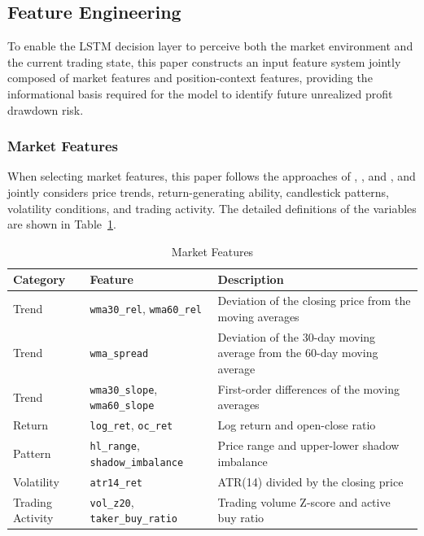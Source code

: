 \documentclass[12pt]{article}
\begin{document}
\subsection{Feature Engineering}

To enable the LSTM decision layer to perceive both the market environment and the current 
trading state, this paper constructs an input feature system jointly composed of market 
features and position-context features, providing the informational basis required for the 
model to identify future unrealized profit drawdown risk.

\subsubsection{Market Features}

When selecting market features, this paper follows the approaches of \citet{FischerKrauss2018}, 
\citet{HuangWanZhangLu2024}, and \citet{AlKhatibEtAl2022}, and jointly considers price trends, 
return-generating ability, candlestick patterns, volatility conditions, and trading activity. 
The detailed definitions of the variables are shown in Table~\ref{tab:market_features}.

\begin{table}[htbp]
\centering
\caption{Market Features}
\label{tab:market_features}
\small
\renewcommand{\arraystretch}{1.2}
\begin{tabular}{p{}p{}p{}}
\toprule
Category & Feature & Description \\
\midrule
Trend &
\texttt{wma30\_rel}, \texttt{wma60\_rel} &
Deviation of the closing price from the moving averages \\
Trend &
\texttt{wma\_spread} &
Deviation of the 30-day moving average from the 60-day moving average \\
Trend &
\texttt{wma30\_slope}, \texttt{wma60\_slope} &
First-order differences of the moving averages \\
Return &
\texttt{log\_ret}, \texttt{oc\_ret} &
Log return and open-close ratio \\
Pattern &
\texttt{hl\_range}, \texttt{shadow\_imbalance} &
Price range and upper-lower shadow imbalance \\
Volatility &
\texttt{atr14\_ret} &
ATR(14) divided by the closing price \\
Trading Activity &
\texttt{vol\_z20}, \texttt{taker\_buy\_ratio} &
Trading volume Z-score and active buy ratio \\
\bottomrule
\end{tabular}
\end{table}
\end{document}
